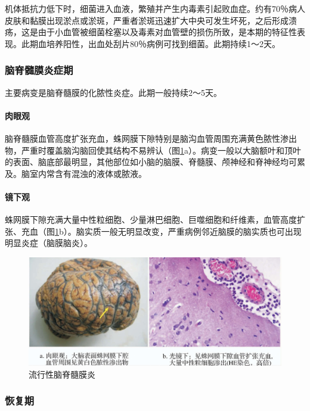 机体抵抗力低下时，细菌进入血液，繁殖并产生内毒素引起败血症。约有70％病人皮肤和黏膜出现淤点或淤斑，严重者淤斑迅速扩大中央可发生坏死，之后形成溃疡，这是由于小血管被细菌栓塞以及毒素对血管壁的损伤所致，是本期的特征性表现。此期血培养阳性，出血处刮片80％病例可找到细菌。此期持续1～2天。

\subsubsection{脑脊髓膜炎症期}

主要病变是脑脊髓膜的化脓性炎症。此期一般持续2～5天。

\paragraph{肉眼观}
脑脊髓膜血管高度扩张充血，蛛网膜下隙特别是脑沟血管周围充满黄色脓性渗出物，严重时覆盖脑沟脑回使其结构不易辨认（图\ref{fig13-1}a）。病变一般以大脑额叶和顶叶的表面、脑底部最明显，其他部位如小脑的脑膜、脊髓膜、颅神经和脊神经均可累及。脑室内常含有混浊的液体或脓液。

\paragraph{镜下观}
蛛网膜下隙充满大量中性粒细胞、少量淋巴细胞、巨噬细胞和纤维素，血管高度扩张、充血（图\ref{fig13-1}b）。脑实质一般无明显改变，严重病例邻近脑膜的脑实质也可出现明显炎症（脑膜脑炎）。

\begin{figure}[!htbp]
 \centering
 \includegraphics{./images/Image00217.jpg}
 \captionsetup{justification=centering}
 \caption{流行性脑脊髓膜炎}
 \label{fig13-1}
  \end{figure} 

\subsubsection{恢复期}

